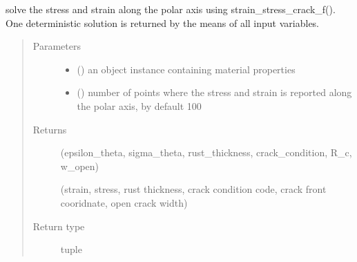 \documentclass[letterpaper,10pt,english]{sphinxmanual}
\begin{document}

\begin{fulllineitems}
\label{\detokenize{cracking:cracking.solve_stress_strain_crack_deterministic}}
\sphinxAtStartPar
solve the stress and strain along the polar axis using strain\_stress\_crack\_f().
One deterministic solution is returned by the means of all input variables.
\begin{quote}\begin{description}
\item[{Parameters}] \leavevmode\begin{itemize}
\item {} 
\sphinxAtStartPar
{} () \textendash{} an object instance containing material properties

\item {} 
\sphinxAtStartPar
{} (\sphinxstyleliteralemphasis{\sphinxupquote{, }}) \textendash{} number of points where the stress and strain is reported along
the polar axis, by default 100

\end{itemize}

\item[{Returns}] \leavevmode
\sphinxAtStartPar

\sphinxAtStartPar
(epsilon\_theta, sigma\_theta, rust\_thickness,
crack\_condition, R\_c, w\_open)

\sphinxAtStartPar
(strain, stress, rust thickness,
crack condition code, crack front cooridnate, open crack width)


\item[{Return type}] \leavevmode
\sphinxAtStartPar
tuple

\end{description}\end{quote}

\end{fulllineitems}
\end{document}
